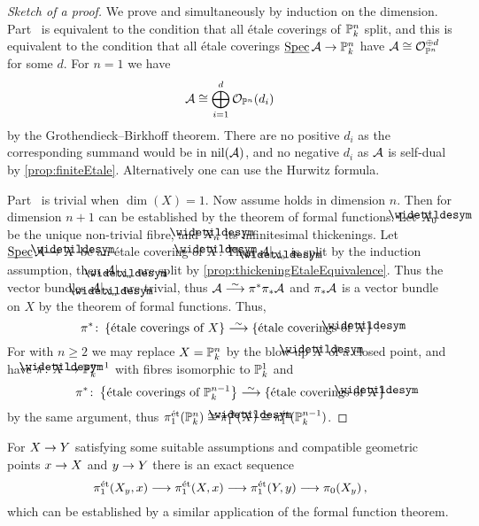 \begin{proof}[Sketch of a proof]
	We prove  and  simultaneously by induction on the dimension. Part~ is equivalent to the condition that all étale coverings of $\mathbb{P}_k^n$ split, and this is equivalent to the condition that all étale coverings $\SPEC\Aa\morphism\IP_k^n$ have $\mathcal{A}\cong \mathcal{O}_{\mathbb{P}^n}^{\oplus d}$ for some $d$. For $n=1$ we have
	\begin{equation*}
		\mathcal{A}\cong \bigoplus_{i=1}^d\mathcal{O}_{\mathbb{P}^n}(d_i)
	\end{equation*}
	by the Grothendieck--Birkhoff theorem. There are no positive $d_i$ as the corresponding summand would be in $\operatorname{nil}(\mathcal{A})$, and no negative $d_i$ as $\mathcal{A}$ is self-dual by \cref{prop:finiteEtale}. Alternatively one can use the Hurwitz formula.
	
	Part~ is trivial when $\dim(X)=1$. Now assume  holds in dimension $n$. Then  for dimension $n+1$ can be established by the theorem of formal functions. Let $\snake{X}_0$ be the unique non-trivial fibre, and $\snake{X}_n$ its infinitesimal thickenings. Let $\SPEC\Aa\morphism\snake{X}$ be an étale covering of $\snake{X}$. Then $\Aa|_{\snake{X}_0}$ is split by the induction assumption, then $\Aa|_{\snake{X}_n}$ are split by \cref{prop:thickeningEtaleEquivalence}. Thus the vector bundles $\Aa|_{\snake{X}_n}$ are trivial, thus $\Aa\isomorphism\pi^*\pi_*\Aa$ and $\pi_*\mathcal{A}$ is a vector bundle on $X$ by the theorem of formal functions. Thus,
	\begin{equation*}
		\pi^*\colon\left\{\text{étale coverings of $X$}\right\}\isomorphism\left\{\text{étale coverings of $\snake{X}$}\right\}\,.
	\end{equation*}
	For  with $n\geq 2$ we may replace $X=\mathbb{P}_k^n$ by the blow-up $\snake{X}$ of a closed point, and have $\pi\colon \snake{X}\morphism\IP_k^{n-1}$ with fibres isomorphic to $\mathbb{P}_k^1$ and
	\begin{equation*}
	\pi^*\colon\left\{\text{étale coverings of $\IP_k^{n-1}$}\right\}\isomorphism\left\{\text{étale coverings of $\snake{X}$}\right\}
	\end{equation*}
	by the same argument, thus $\pi_1^\et(\IP_k^n)\cong \pi_1^\et(\snake{X})\cong \pi_1^\et(\IP_k^{n-1})$.
\end{proof}
\begin{rem}
	For $X\morphism Y$ satisfying some suitable assumptions and compatible geometric points $x\morphism X$ and $y\morphism Y$ there is an exact sequence
	\begin{equation*}
		\pi_1^\et(X_y,x)\morphism\pi_1^\et(X,x)\morphism\pi_1^\et(Y,y)\morphism\pi_0(X_y)\,,
	\end{equation*}
	which can be established by a similar application of the formal function theorem.
\end{rem}

